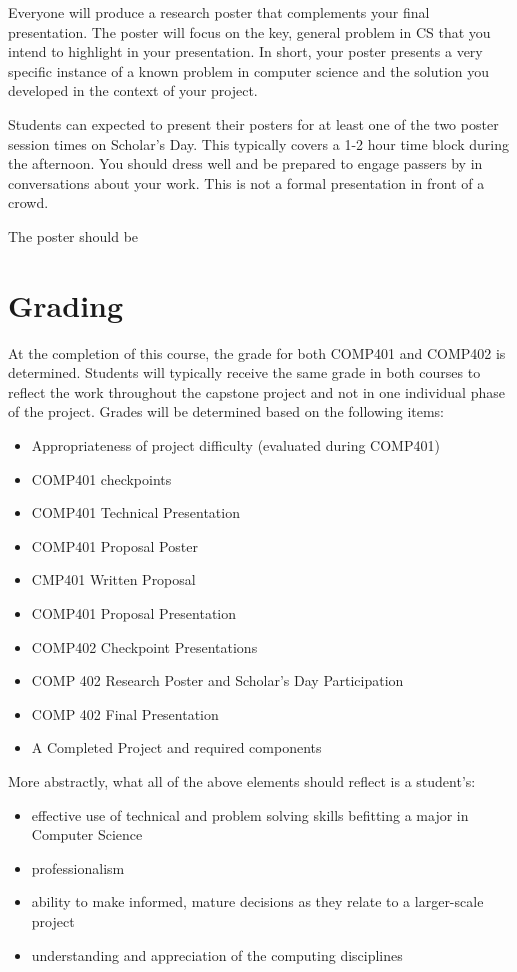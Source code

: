 \documentclass[10pt]{article}
\begin{document}
Everyone will produce a research poster that complements your final presentation. The poster will focus on the key, general problem in CS that you intend to highlight in your presentation.  In short, your poster presents a very specific instance of a known problem in computer science and the solution you developed in the context of your project. 

Students can expected to present their posters for at least one of the two poster session times on Scholar's Day.  This typically covers a 1-2 hour time block during the afternoon.  You should dress well and be prepared to engage passers by in conversations about your work.  This is not a formal presentation in front of a crowd.    

The poster should be 


\section{Grading}

At the completion of this course, the grade for both COMP401 and COMP402 is determined. Students will typically receive the same grade in both courses to reflect the work throughout the capstone project and not in one individual phase of the project. Grades will be determined based on the following items:
\begin{itemize}
\item Appropriateness of project difficulty (evaluated during COMP401) 
\item COMP401 checkpoints
\item COMP401 Technical Presentation
\item COMP401 Proposal Poster
\item CMP401 Written Proposal
\item COMP401 Proposal Presentation
\item COMP402 Checkpoint Presentations 
\item COMP 402 Research Poster and Scholar's Day Participation 
\item COMP 402 Final Presentation 
\item A Completed Project and required components
\end{itemize}

More abstractly, what all of the above elements should reflect is a student's: 
\begin{itemize}
\item effective use of technical and problem solving skills befitting a major in Computer Science
\item professionalism
\item ability to make informed, mature decisions as they relate to a larger-scale project
\item understanding and appreciation of the computing disciplines
\end{itemize}
\end{document}
